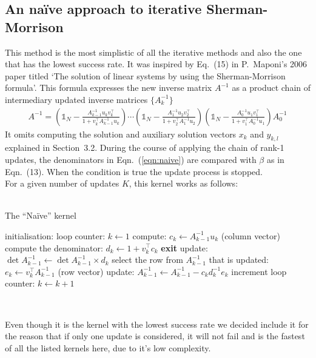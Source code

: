 \documentclass[11pt]{article}
\numberwithin{figure}{section}
\numberwithin{table}{section}
\begin{document}
			\subsection{An na\"{i}ve approach to iterative Sherman-Morrison}\label{sec:naive}
				This method is the most simplistic of all the iterative methods and also the one that has the lowest success rate. It was inspired by Eq.~(15) in P.~Maponi's 2006 paper titled `The solution of linear systems by using the Sherman-Morrison formula'\cite{MAPONI2007276}. This formula expresses the new inverse matrix $A^{-1}$ as a product chain of intermediary updated inverse matrices $\{A_k^{-1}\}$
				\begin{align}\label{eqn:naive}
					A^{-1} =
		\left(\mathbb{1}_N-\frac{A_{k-1}^{-1}u_kv_k^\top}{1+v_k^\top A_{k-1}^{-1}u_k}\right)
		\cdots
		\left(\mathbb{1}_N-\frac{A_1^{-1}u_2v_2^\top }{1+v_2^\top A_1^{-1}u_2}\right)
		\left(\mathbb{1}_N-\frac{A_0^{-1}u_1v_1^\top }{1+v_1^\top A_0^{-1}u_1}\right)
		A_0^{-1}
				\end{align}
				It omits computing the solution and auxiliary solution vectors $x_k$ and $y_{k,l}$ explained in Section~3.2. During the course of applying the chain of rank-1 updates, the denominators in Eqn.~(\ref{eqn:naive}) are compared with $\beta$ as in Eqn.~(13). When the condition is true the update process is stopped.\\
	
				For a given number of updates $K$, this kernel works as follows:\\
				\\
				\begin{algorithm}[H]
				\caption{The ``Na\"{i}ve'' kernel}\label{algo:naive}
				initialisation: loop counter: $k \gets 1$\;
				{
					compute: $c_k \gets A^{-1}_{k-1}u_k$ (column vector)\;
					compute the denominator: $d_k \gets 1 + v_k^\top c_k$\;
					{
						\textbf{exit}\;
					}
					update: $\det A^{-1}_{k-1} \gets \det A^{-1}_{k-1}\times d_k$\;
					select the row from $A^{-1}_{k-1}$ that is updated: $e_k \gets v_k^\top A^{-1}_{k-1}$ (row vector)\;
					update: $A^{-1}_{k-1} \gets A^{-1}_{k-1} - c_kd_k^{-1}e_k$\;
					increment loop counter: $k \gets k + 1$\;
				}
				\end{algorithm}\

				Even though it is the kernel with the lowest success rate we decided include it for the reason that if only one update is considered, it will not fail and is the fastest of all the listed kernels here, due to it's low complexity.
		
\end{document}
